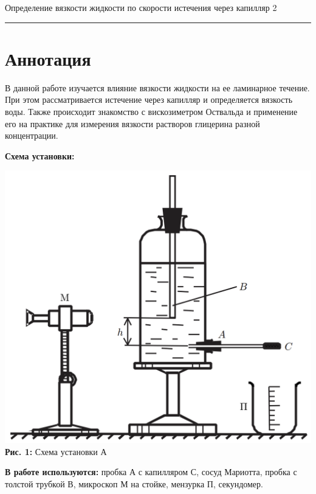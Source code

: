 \documentclass[12pt,a4paper]{scrartcl}
\begin{document}
	
	\begin{flushleft}
		\footnotesize{Определение вязкости жидкости по скорости истечения через капилляр} \hspace{\fill} \footnotesize{2}
		\\[-0.3cm]\noindent\rule{\textwidth}{0.3pt}
	\end{flushleft}
	
	\section{Аннотация}
	
	В данной работе изучается влияние вязкости жидкости на ее ламинарное течение. При этом рассматривается истечение через капилляр и определяется вязкость воды. Также происходит знакомство с вискозиметром Оствальда и применение его на практике для измерения вязкости растворов глицерина разной концентрации.
	
	\textbf{Схема установки:}
	\begin{center}
		\includegraphics[scale=0.3]{PIC_1.png}
		\\\textbf{Рис. 1:} Схема установки А
	\end{center}
	
	
	\textbf{В работе используются:} пробка А с капилляром С, сосуд Мариотта, пробка с толстой трубкой В, микроскоп М на стойке, мензурка П, секундомер.
	
\end{document}
